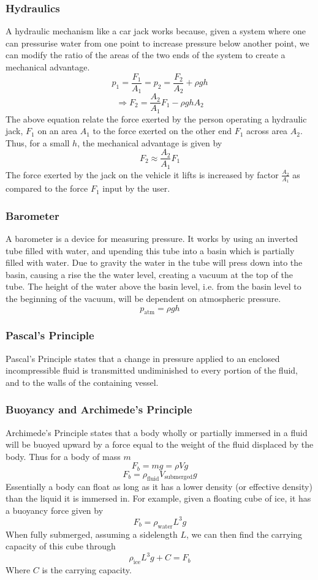 \documentclass[12pt]{report}
\begin{document}
\begin{flushleft}
\subsubsection*{Hydraulics}

A hydraulic mechanism like a car jack works because, given a system where one
can pressurise water from one point to increase pressure below another point,
we can modify the ratio of the areas of the two ends of the system to create a
mechanical advantage.
\[p_1 = \frac{F_1}{A_1} = p_2 = \frac{F_2}{A_2} + \rho gh\]
\[\Rightarrow F_2 = \frac{A_2}{A_1}F_1 - \rho gh A_2\]
The above equation relate the force exerted by the person operating a hydraulic
jack, \(F_1\) on an area \(A_1\) to the force exerted on the other end \(F_1\)
across area \(A_2\). Thus, for a small \(h\), the mechanical advantage is given
by
\[F_2 \approx \frac{A_2}{A_1}F_1\]
The force exerted by the jack on the vehicle it lifts is increased by factor
\(\frac{A_2}{A_1}\) as compared to the force \(F_1\) input by the user.

\subsubsection*{Barometer}

A barometer is a device for measuring pressure. It works by using an inverted
tube filled with water, and upending this tube into a basin which is partially
filled with water. Due to gravity the water in the tube will press down into
the basin, causing a rise the the water level, creating a vacuum at the top of
the tube. The height of the water above the basin level, i.e. from the basin
level to the beginning of the vacuum, will be dependent on atmospheric
pressure.
\[p_\mathrm{atm} = \rho gh\]

\subsubsection*{Pascal's Principle}

Pascal's Principle states that a change in pressure applied to an enclosed
incompressible fluid is transmitted undiminished to every portion of the fluid,
and to the walls of the containing vessel.

\subsubsection*{Buoyancy and Archimede's Principle}

Archimede's Principle states that a body wholly or partially immersed in a
fluid will be buoyed upward by a force equal to the weight of the fluid
displaced by the body. Thus for a body of mass \(m\)
\[F_b = mg = \rho Vg\]
\[F_b = \rho_\mathrm{fluid}V_\mathrm{submerged}g\]
Essentially a body can float as long as it has a lower density (or effective
density) than the liquid it is immersed in. For example, given a floating cube
of ice, it has a buoyancy force given by
\[F_b = \rho_\mathrm{water}L^3g\]
When fully submerged, assuming a sidelength \(L\), we can then find the
carrying capacity of this cube through
\[\rho_\mathrm{ice}L^3g + C = F_b\]
Where \(C\) is the carrying capacity.


\end{flushleft}
\end{document}
